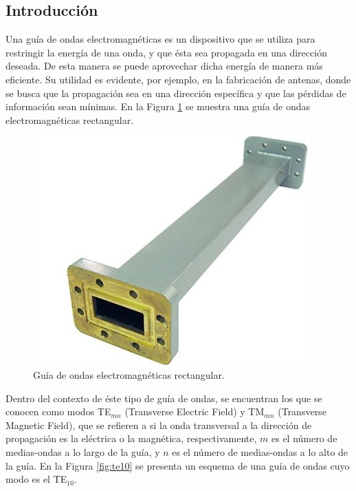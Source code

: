\documentclass[11pt,a4paper]{article}
\begin{document}
\begin{multicols}{2}
\section{Introducción}
Una guía de ondas electromagnéticas es un dispositivo que se utiliza para restringir la energía de una onda, y que ésta sea propagada en una dirección deseada. De esta manera se puede aprovechar dicha energía de manera más eficiente. Su utilidad es evidente, por ejemplo, en la fabricación de antenas, donde se busca que la propagación sea en una dirección específica y que las pérdidas de información sean mínimas. En la Figura \ref{fig:guia} se muestra una guía de ondas electromagnéticas rectangular.
\begin{figure}[H]
    \centering
    \includegraphics[scale=0.6]{Images/Imagen1.jpg}
    \caption{Guía de ondas electromagnéticas rectangular.}
    \label{fig:guia}
\end{figure}
Dentro del contexto de éste tipo de guía de ondas, se encuentran los que se conocen como modos TE$_{mn}$ (Transverse Electric Field) y TM$_{mn}$ (Transverse Magnetic Field), que se refieren a si la onda transversal a la dirección de propagación es la eléctrica o la magnética, respectivamente, $m$ es el número de medias-ondas a lo largo de la guía, y $n$ es el número de medias-ondas a lo alto de la guía. En la Figura \ref{fig:te10} se presenta un esquema de una guía de ondas cuyo modo es el TE$_{10}$.
\begin{figure}[H]
    \centering

\end{figure}
\end{multicols}
\end{document}
